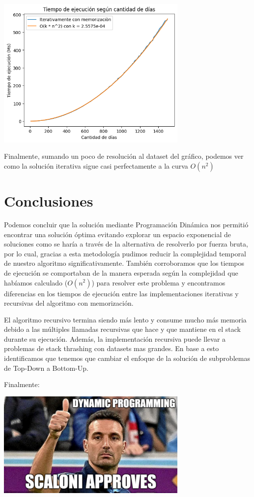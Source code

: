 \documentclass{estilo}
\begin{document}
\begin{center}
\includegraphics[width=0.7\textwidth]{img/Results3.png}
\end{center}
Finalmente, sumando un poco de resolución al dataset del gráfico, podemos ver como la solución iterativa sigue casi perfectamente a la curva $O(n^2)$

\section{Conclusiones}
Podemos concluir que la solución mediante Programación Dinámica nos permitió encontrar una solución óptima evitando explorar un espacio exponencial de soluciones como se haría a través de la alternativa de resolverlo por fuerza bruta, por lo cual, gracias a esta metodología pudimos reducir la complejidad temporal de nuestro algoritmo significativamente. También corroboramos que los tiempos de ejecución se comportaban de la manera esperada según la complejidad que habíamos calculado ($O(n ^ 2)$) para resolver este problema y encontramos diferencias en los tiempos de ejecución entre las implementaciones iterativas y recursivas del algoritmo con memorización. 

El algoritmo recursivo termina siendo más lento y consume mucho más memoria debido a las múltiples llamadas recursivas que hace y que mantiene en el stack durante su ejecución. Además, la implementación recursiva puede llevar a problemas de stack thrashing con datasets mas grandes. En base a esto identificamos que tenemos que cambiar el enfoque de la solución de subproblemas de Top-Down a Bottom-Up.

Finalmente:
\begin{center}
\includegraphics[width=0.7\textwidth]{img/Scaloni.png}
\end{center}
\end{document}
